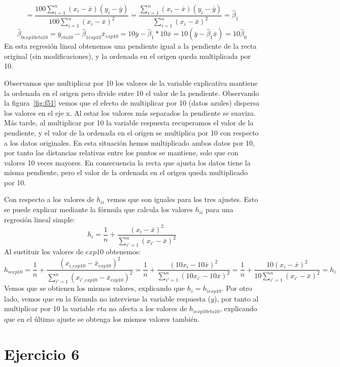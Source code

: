 \documentclass[a4paper]{article}
\begin{document}
\[ = \frac{100\sum_{i=1}^n(x_{i} - \bar{x})(y_i - \bar{y})}{100\sum_{i=1}^n(x_{i} - \bar{x})^2} = \frac{\sum_{i=1}^n(x_{i} - \bar{x})(y_i - \bar{y})}{\sum_{i=1}^n(x_{i} - \bar{x})^2} = \hat{\beta}_{1}  \]
\[ \hat{\beta}_{0exp10rta10} = \bar{y}_{rta10} - \hat{\beta}_{1exp10}\bar{x}_{exp10} = 10\bar{y} - \hat{\beta}_{1} * 10\bar{x} = 10(\bar{y} - \hat{\beta}_{1}\bar{x}) = 10\hat{\beta}_{0}\]
En esta regresión lineal obtenemos una pendiente igual a la pendiente de la recta original (sin modificaciones), y la ordenada en el origen queda multiplicada por 10.\par
Observamos que multiplicar por 10 los valores de la variable explicativa mantiene la ordenada en el origen pero divide entre 10 el valor de la pendiente. Observando la figura~\ref{fig:f51} vemos que el efecto de multiplicar por 10 (datos azules) dispersa los valores en el eje x. Al estar los valores más separados la pendiente se suaviza. Más tarde, al multiplicar por 10 la variable respuesta recuperamos el valor de la pendiente, y el valor de la ordenada en el origen se multiplica por 10 con respecto a los datos originales. En esta situación hemos multiplicado ambos datos por 10, por tanto las distancias relativas entre los puntos se mantiene, solo que con valores 10 veces mayores. En consecuencia la recta que ajusta los datos tiene la misma pendiente, pero el valor de la ordenada en el origen queda multiplicado por 10.\par
Con respecto a los valores de $h_{ii}$ vemos que son iguales para los tres ajustes. Esto se puede explicar mediante la fórmula que calcula los valores $h_{ii}$ para una regresión lineal simple:
\[ h_i = \frac{1}{n} + \frac{(x_i - \bar{x})^2}{\sum_{i'=1}^n(x_{i'} - \bar{x})^2}       \]
Al sustituir los valores de $exp10$ obtenemos: 
\[ h_{iexp10} = \frac{1}{n} + \frac{(x_{i\_exp10} - \bar{x}_{exp10})^2}{\sum_{i'=1}^n(x_{i'\_exp10} - \bar{x}_{exp10})^2} = \frac{1}{n} + \frac{(10x_i - 10\bar{x})^2}{\sum_{i'=1}^n(10x_{i'} - 10\bar{x})^2} = \frac{1}{n} + \frac{10(x_i - \bar{x})^2}{10\sum_{i'=1}^n(x_{i'} - \bar{x})^2} = h_{i}      \]
Vemos que se obtienen los mismos valores, explicando que $h_{i} = h_{iexp10}$. Por otro lado, vemos que en la fórmula no interviene la variable respuesta ($y$), por tanto al multiplicar por 10 la variable $rta$ no afecta a los valores de $h_{iexp10rta10}$, explicando que en el último ajuste se obtenga los mismos valores también.

\section{Ejercicio 6}
\end{document}
